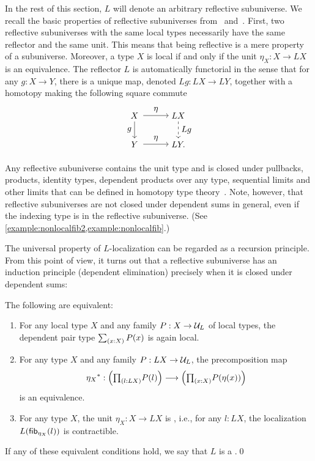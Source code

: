 In the rest of this section, $L$ will denote an arbitrary reflective subuniverse.
We recall the basic properties of reflective subuniverses from~\cite{RijkeShulmanSpitters} and~\cite[Section~7.7]{hottbook}.
First, two reflective subuniverses with the same local types necessarily have the same reflector and the same unit.
This means that being reflective is a mere property of a subuniverse.
Moreover, a type $X$ is local if and only if the unit $\eta_X : X \to LX$ is an equivalence.
The reflector $L$ is automatically functorial in the sense that for any
$g : X \to Y$, there is a unique map, denoted $Lg : LX \to LY$, together with a homotopy making the following square commute
\[
        \begin{tikzpicture}
          \matrix (m) [matrix of math nodes,row sep=2em,column sep=3em,minimum width=2em]
          { X & L X \\
            Y & L Y . \\};
          \path[->]
            (m-1-1) edge node [above] {$\eta$} (m-1-2)
                    edge node [left] {$g$} (m-2-1)
            (m-2-1) edge node [above] {$\eta$} (m-2-2)
            (m-1-2) edge [dashed] node [right]{$L g$} (m-2-2)
            ;
        \end{tikzpicture}
\]

Any reflective subuniverse contains the unit type and is closed under
pullbacks, products, identity types, dependent products over any type,
sequential limits and other
limits that can be defined in homotopy type theory~\cite{AKL}.
Note, however, that reflective subuniverses are not closed under dependent sums in general,
even if the indexing type is in the reflective subuniverse.
(See \cref{example:nonlocalfib2,example:nonlocalfib}.)

The universal property of $L$-localization can be regarded as a recursion principle.
From this point of view, it turns out that a reflective subuniverse has an induction principle (dependent elimination)
precisely when it is closed under dependent sums:

\begin{thm}\label{modality}
The following are equivalent:
\begin{enumerate}
\item For any local type $X$ and any family $P:X \to \mathcal{U}_L$ of local types, the dependent pair type $\sm{x:X} P(x)$ is again local.
\item For any type $X$ and any family $P:LX\to\mathcal{U}_L$, the precomposition map
\[
  \precomp{\eta_X}: \Big( \prd{l:LX} P(l) \Big) \lra \Big( \prd{x:X} P(\eta(x)) \Big)
\]
is an equivalence.  %
\item For any type $X$, the unit $\eta_X: X \to LX$ is , i.e., for any $l:LX$, the localization $L(\mathsf{fib}_{\eta_X}(l))$ is contractible.
\end{enumerate}
If any of these equivalent conditions hold, we say that $L$ is a .\qed
\end{thm}

